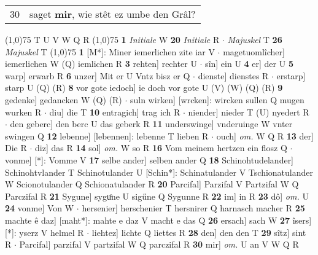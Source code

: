 \documentclass[8pt,a4paper,notitlepage]{article}
\begin{document}
\begin{table}[ht]
\begin{minipage}[t]{0.5\linewidth}
\begin{tabular}{rl}
30 & saget \textbf{mir}, wie stêt ez umbe den Grâl?\\ 
\end{tabular}
\scriptsize
\line(1,0){75} \newline
T U V W Q R \newline
\line(1,0){75} \newline
\textbf{1} \textit{Initiale} W  \textbf{20} \textit{Initiale} R   $\cdot$ \textit{Majuskel} T  \textbf{26} \textit{Majuskel} T  \newline
\line(1,0){75} \newline
\textbf{1} [M*]: Miner iemerlichen zite iar V  $\cdot$ magetuomlîcher] iemerlichen W (Q) iemlichen R \textbf{3} rehten] rechter U  $\cdot$ sîn] ein U \textbf{4} er] der U \textbf{5} warp] erwarb R \textbf{6} unzer] Mit er U Vntz bisz er Q  $\cdot$ dienste] dienstes R  $\cdot$ erstarp] starp U (Q) (R) \textbf{8} vor gote iedoch] ie doch vor gote U (V) (W) (Q) (R) \textbf{9} gedenke] gedancken W (Q) (R)  $\cdot$ suln wirken] [wrcken]: wircken sullen Q mugen wurken R  $\cdot$ diu] die T \textbf{10} entragich] trag ich R  $\cdot$ niender] nieder T (U) nyedert R  $\cdot$ den geberc] den berc U das geberk R \textbf{11} underswinge] vnderuinge W vnter swingen Q \textbf{12} lebenne] [lebennen]: lebenne T lieben R  $\cdot$ ouch] \textit{om.} W Q R \textbf{13} der] Die R  $\cdot$ diz] das R \textbf{14} sol] \textit{om.} W so R \textbf{16} Vom meinem hertzen ein flosz Q  $\cdot$ vonme] [*]: Vomme V \textbf{17} selbe ander] selben ander Q \textbf{18} Schinohtudelander] Schinohtvlander T Schinotulander U [Schin*]: Schinatulander V Tschionatulander W Scionotulander Q Schionatulander R \textbf{20} Parcifal] Parzifal V Partzifal W Q Parczifal R \textbf{21} Sygune] syguͦne U sigűne Q Sygunne R \textbf{22} im] in R \textbf{23} dô] \textit{om.} U \textbf{24} vonme] Von W  $\cdot$ hersenier] herschenier T hersnirer Q harnasch macher R \textbf{25} machte ê daz] [maht*]: mahte e daz V macht e das Q \textbf{26} ersach] sach W \textbf{27} îsers] [*]: yserz V helmel R  $\cdot$ liehtez] lichte Q liettes R \textbf{28} den] den den T \textbf{29} sîtz] sint R  $\cdot$ Parcifal] parzifal V partzifal W Q parczifal R \textbf{30} mir] \textit{om.} U an V W Q R \newline
\end{minipage}
\end{table}
\end{document}

